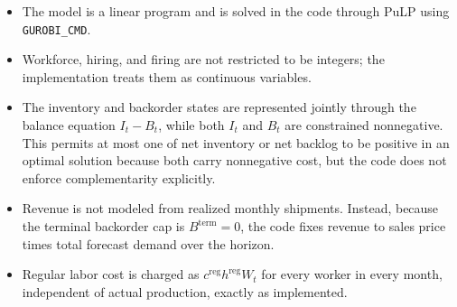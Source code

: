 \begin{itemize}
    \item The model is a linear program and is solved in the code through PuLP using \texttt{GUROBI\_CMD}.
    \item Workforce, hiring, and firing are not restricted to be integers; the implementation treats them as continuous variables.
    \item The inventory and backorder states are represented jointly through the balance equation \(I_t-B_t\), while both \(I_t\) and \(B_t\) are constrained nonnegative. This permits at most one of net inventory or net backlog to be positive in an optimal solution because both carry nonnegative cost, but the code does not enforce complementarity explicitly.
    \item Revenue is not modeled from realized monthly shipments. Instead, because the terminal backorder cap is \(B^{\mathrm{term}}=0\), the code fixes revenue to sales price times total forecast demand over the horizon.
    \item Regular labor cost is charged as \(c^{\mathrm{reg}} h^{\mathrm{reg}} W_t\) for every worker in every month, independent of actual production, exactly as implemented.
\end{itemize}
